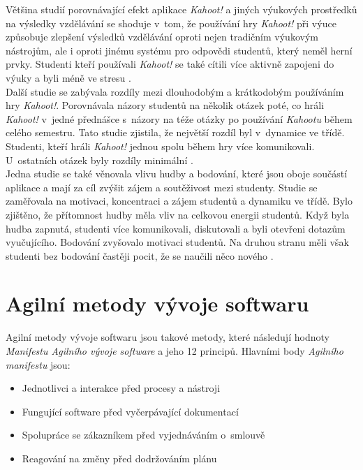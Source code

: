 \documentclass[12pt]{report}
\begin{document}
Většina studií porovnávající efekt aplikace \textit{Kahoot!} a jiných výukových prostředků na výsledky vzdělávání se shoduje v~tom, že používání hry \textit{Kahoot!} při výuce způsobuje zlepšení výsledků vzdělávání oproti nejen tradičním výukovým nástrojům, ale i oproti jinému systému pro odpovědi studentů, který neměl herní prvky. Studenti kteří používali \textit{Kahoot!} se také cítili více aktivně zapojeni do výuky a byli méně ve stresu \cite{turan2018}.\\

Další studie se zabývala rozdíly mezi dlouhodobým a krátkodobým používáním hry \textit{Kahoot!}. Porovnávala názory studentů na několik otázek poté, co hráli \textit{Kahoot!} v~jedné přednášce s~názory na téže otázky po používání \textit{Kahootu} během celého semestru. Tato studie zjistila, že největší rozdíl byl v~dynamice ve třídě. Studenti, kteří hráli \textit{Kahoot!} jednou spolu během hry více komunikovali. U~ostatních otázek byly rozdíly minimální \cite{Wang2015}.\\

Jedna studie se také věnovala vlivu hudby a bodování, které jsou oboje součástí aplikace a mají za cíl zvýšit zájem a soutěživost mezi studenty. Studie se zaměřovala na motivaci, koncentraci a zájem studentů a dynamiku ve třídě. Bylo zjištěno, že přítomnost hudby měla vliv na celkovou energii studentů. Když byla hudba zapnutá, studenti více komunikovali, diskutovali a byli otevřeni dotazům vyučujícího. Bodování zvyšovalo motivaci studentů. Na druhou stranu měli však studenti bez bodování častěji pocit, že se naučili něco nového \cite{Wang2016}.

\chapter{Agilní metody vývoje softwaru}
	
	Agilní metody vývoje softwaru jsou takové metody, které následují hodnoty \textit{Manifestu Agilního vývoje software} a jeho 12 principů. Hlavními body \textit{Agilního manifestu} jsou: 
	\begin{itemize}
\item Jednotlivci a interakce před procesy a nástroji
\item Fungující software před vyčerpávající dokumentací
\item Spolupráce se zákazníkem před vyjednáváním o~smlouvě
\item Reagování na změny před dodržováním plánu \cite{Beck2001}
	\end{itemize}
	
\end{document}
